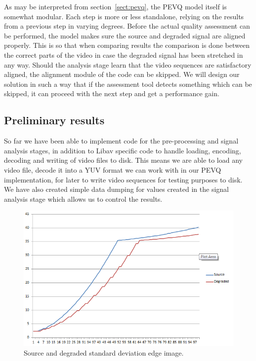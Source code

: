 As may be interpreted from section~\ref{sect:pevq}, the PEVQ model itself is somewhat modular. Each step is more or less standalone, relying on the results from a previous step in varying degrees. Before the actual quality assessment can be performed, the model makes sure the source and degraded signal are aligned properly. This is so that when comparing results the comparison is done between the correct parts of the video in case the degraded signal has been stretched in any way. Should the analysis stage learn that the video sequences are satisfactory aligned, the alignment module of the code can be skipped. 
We will design our solution in such a way that if the assessment tool detects something which can be skipped, it can proceed with the next step and get a performance gain.

\subsection{Preliminary results}\label{sect:results}

So far we have been able to implement code for the pre-processing and signal analysis stages, in addition to Libav specific code to handle loading, encoding, decoding and writing of video files to disk. This means we are able to load any video file, decode it into a YUV format we can work with in our PEVQ implementation, for later to write video sequences for testing purposes to disk. We have also created simple data dumping for values created in the signal analysis stage which allows us to control the results. 

\begin{figure}[h]
	\centering
	\includegraphics[width=.7\textwidth,natwidth=672,natheight=435]{images/stdDevEdgeImg.png}
	\caption{Source and degraded standard deviation edge image.}
	\label{fig:stdDevEdgeImg}
\end{figure}

